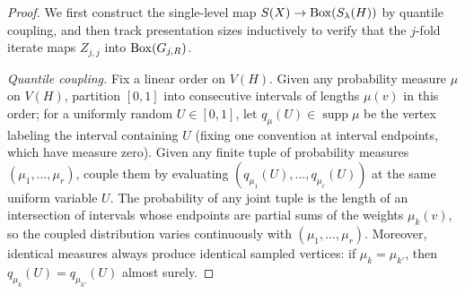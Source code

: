 \begin{proof}
We first construct the single-level map $S(X)\to\operatorname{Box}(S_\lambda(H))$ by quantile coupling, and then track presentation sizes inductively to verify that the $j$-fold iterate maps $Z_{j,j}$ into $\operatorname{Box}(G_{j,R})$.

\emph{Quantile coupling.} Fix a linear order on $V(H)$. Given any probability measure $\mu$ on $V(H)$, partition $[0,1]$ into consecutive intervals of lengths $\mu(v)$ in this order; for a uniformly random $U\in[0,1]$, let $q_\mu(U)\in\operatorname{supp}\mu$ be the vertex labeling the interval containing $U$ (fixing one convention at interval endpoints, which have measure zero). Given any finite tuple of probability measures $(\mu_1,\ldots,\mu_r)$, couple them by evaluating $(q_{\mu_1}(U),\ldots,q_{\mu_r}(U))$ at the same uniform variable $U$. The probability of any joint tuple is the length of an intersection of intervals whose endpoints are partial sums of the weights $\mu_k(v)$, so the coupled distribution varies continuously with $(\mu_1,\ldots,\mu_r)$. Moreover, identical measures always produce identical sampled vertices: if $\mu_k=\mu_{k'}$, then $q_{\mu_k}(U)=q_{\mu_{k'}}(U)$ almost surely.


\end{proof}
